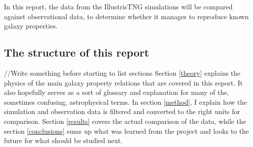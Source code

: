 In this report, the data from the IllustrisTNG simulations will be compared against observational data, to determine whether it manages to reproduce known galaxy properties.


\subsection{The structure of this report}
//Write something before starting to list sections
Section \ref{theory} explains the physics of the main galaxy property relations that are covered in this report. It also hopefully serves as a sort of glossary and explanation for many of the, sometimes confusing, astrophysical terms. In section \ref{method}, I explain how the simulation and observation data is filtered and converted to the right units for comparison. Section \ref{results} covers the actual comparison of the data, while the section \ref{conclusions} sums up what was learned from the project and looks to the future for what should be studied next.